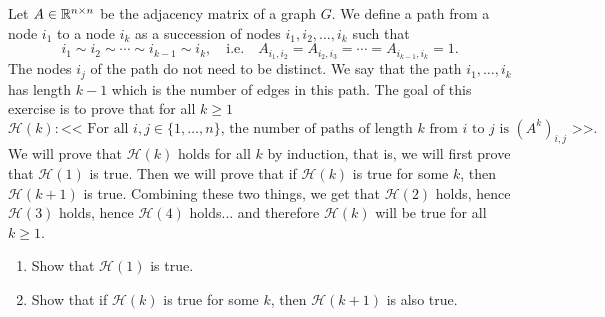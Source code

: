\documentclass[11pt,nocut]{article}
\begin{document}
\begin{problem}[2 points]
	Let $A \in \mathbb{R}^{n\times n}$ be the adjacency matrix of a graph $G$.
	We define a path from a node $i_1$ to a node $i_k$ as a succession of nodes $i_1,i_2, \dots, i_{k}$ such that 
	$$
	i_1 \sim i_2 \sim \cdots \sim i_{k-1} \sim i_k,
	\quad \text{i.e.} \quad
	A_{i_1,i_2} = A_{i_2, i_3} = \cdots = A_{i_{k-1},i_k} = 1.
	$$
	The nodes $i_j$ of the path do not need to be distinct. We say that the path $i_1, \dots, i_k$ has length $k-1$ which is the number of edges in this path.
	The goal of this exercise is to prove that for all $k \geq 1$
	$$
	\mathcal{H}(k): \text{<< For all $i,j \in \{1,\dots,n\}$, the number of paths of length $k$ from $i$ to $j$ is $(A^k)_{i,j}$ >>.} 
	$$
	We will prove that $\mathcal{H}(k)$ holds for all $k$ by induction, that is, we will first prove that $\mathcal{H}(1)$ is true. Then we will prove that if $\mathcal{H}(k)$ is true for some $k$, then $\mathcal{H}(k+1)$ is true. Combining these two things, we get that $\mathcal{H}(2)$ holds, hence $\mathcal{H}(3)$ holds, hence $\mathcal{H}(4)$ holds... and therefore $\mathcal{H}(k)$ will be true for all $k \geq 1$.
	
	\begin{enumerate}[label=\normalfont(\textbf{\alph*})]
		\item Show that $\mathcal{H}(1)$ is true.
		\item Show that if $\mathcal{H}(k)$ is true for some $k$, then $\mathcal{H}(k+1)$ is also true.
	\end{enumerate}


\end{problem}

\vspace{1mm}
\end{document}
